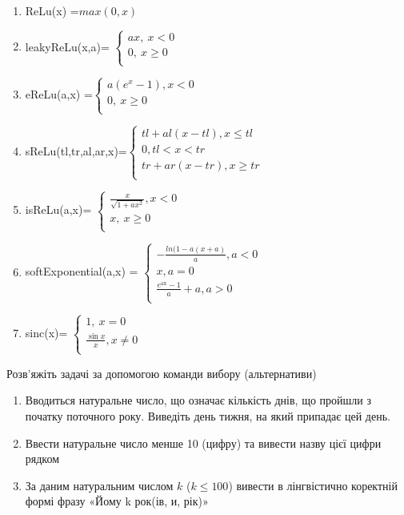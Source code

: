\documentclass[]{article}
\makeatletter
\newcommand{\xslalph}[1]{\expandafter\@xslalph\csname c@#1\endcsname}
\newcommand{\@xslalph}[1]{%
    \ifcase#1\or а\or б\or в\or г\or д\or e\or є\or ж\or з\or i%
    \or й\or к\or л\or м\or н\or о\or п\or р\or с\or т%
    \or у\or ф\or х\or ц\or ч\or ш\or ю\or я\or аа\or бб\or вв %
    \else\@ctrerr\fi%
}
\makeatother
\begin{document}
\begin{enumerate}
\begin{enumerate}[label=\xslalph*)]
\item 
ReLu(x) =\(max(0,x)\)

\item
leakyReLu(x,a)= \(\left\{ \begin{matrix}
ax,\ x < 0 \\
0,\ x \geq 0 \\
\end{matrix} \right.\ \)

\item 
eReLu(a,x) =\(\left\{ \begin{matrix}
a(e^{x} - 1),x < 0 \\
0,\ x \geq 0 \\
\end{matrix} \right.\ \)

\item 
sReLu(tl,tr,al,ar,x)=\(\left\{ \begin{matrix}
tl + al\left( x - tl \right),x \leq tl \\
0,tl < x < tr \\
tr + ar\left( x - tr \right),x \geq tr \\
\end{matrix} \right.\ \)

\item
 isReLu(a,x)= \(\left\{ \begin{matrix}
\frac{x}{\sqrt{1 + ax^{2}}},x < 0 \\
x,\ x \geq 0 \\
\end{matrix} \right.\ \)

\item 
softExponential(a,x) = \(\left\{ \begin{matrix}
 - \frac{ln(1 - a(x + a)}{a},a < 0 \\
x,a = 0 \\
\frac{e^{\text{ax}} - 1}{a} + a,a > 0 \\
\end{matrix} \right.\ \)

\item 
sinc(x)= \(\left\{ \begin{matrix}
1,\ x = 0 \\
\frac{\sin x}{x},x \neq 0 \\
\end{matrix} \right.\ \)

 \end{enumerate}
 \end{enumerate}

Розв'яжіть задачі за допомогою команди вибору (альтернативи)
\begin{enumerate}
\item
Вводиться натуральне число, що означає кількість днів, що пройшли з
початку поточного року. Виведіть день тижня, на який припадає цей день.
\item
Ввести натуральне число менше 10 (цифру) та вивести назву цієї цифри
рядком
\item
За даним натуральним числом $k$ ($k \le 100$) вивести в лінгвістично коректній
формі фразу «Йому k рок(ів, и, рік)»
 \end{enumerate}
\end{document}
